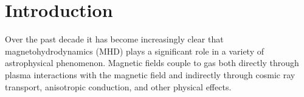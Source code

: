 \section{Introduction}
\label{sec:intro}


Over the past decade it has become increasingly clear that magnetohydrodynamics (MHD) plays a significant role in a variety of astrophysical phenomenon\citep{teyssier_2015, naab_2017, tumlinson_2017, han_2017}. Magnetic fields couple to gas both directly through plasma interactions with the magnetic field and indirectly through cosmic ray transport\citep{werhahn_gamma-ray_2023, yoshida_trajectory_2021}, anisotropic conduction\citep{bruggen_2023}, and other physical effects.



